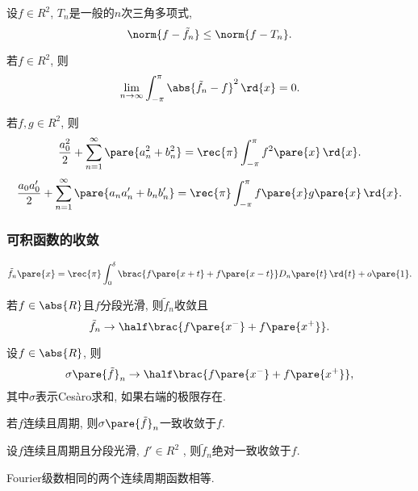 \documentclass[hidelinks]{ctexart}
\begin{document}
\begin{finale}
    \begin{proposition}[范数最优性]
        设$f\in R^2$, $T_n$是一般的$n$次三角多项式,
        \[ \norm{f-\tilde{f}_n} \le \norm{f-T_n}. \]
    \end{proposition}
    \begin{lemma}[平方平均收敛]
        若$f\in R^2$, 则
        \[ \lim_{n\rightarrow \infty} \int_{-\pi}^\pi \abs{\tilde{f}_n-f}^2\,\rd{x} = 0. \]
    \end{lemma}
    \begin{lemma}[Parseval]
        若$f,g\in R^2$, 则
        \[ \frac{a_0^2}{2} + \sum_{n=1}^\infty \pare{a_n^2+b_n^2} = \rec{\pi}\int_{-\pi}^\pi f^2\pare{x}\,\rd{x}. \]
        \[ \frac{a_0 a'_0}{2} + \sum_{n=1}^\infty \pare{a_na'_n+b_nb'_n} = \rec{\pi}\int_{-\pi}^\pi f\pare{x}g\pare{x}\,\rd{x}. \]
    \end{lemma}
\end{finale}


\subsubsection{可积函数的收敛} %
\label{ssub:可积函数的收敛}

\begin{finale}
    \begin{theorem}[局部化定理]
        \[ \tilde{f}_n\pare{x} = \rec{\pi}\int_0^\delta \brac{f\pare{x+t}+f\pare{x-t}}D_n\pare{t}\,\rd{t} + o\pare{1}. \]
    \end{theorem}
    \begin{theorem}[Dirichlet定理]
        若$f\in\abs{R}$且$f$分段光滑, 则$\tilde{f}_n$收敛且
        \[ \tilde{f}_n \rightarrow \half\brac{f\pare{x^-}+f\pare{x^+}}. \]
    \end{theorem}
    \begin{theorem}
        设$f\in\abs{R}$, 则
        \[ \sigma\pare{\tilde{f}}_n \rightarrow \half\brac{f\pare{x^-}+f\pare{x^+}}, \]
        其中$\sigma$表示Ces\`aro求和, 如果右端的极限存在.
    \end{theorem}
    \begin{theorem}
        若$f$连续且周期, 则$\sigma\pare{\tilde{f}}_n$一致收敛于$f$.
    \end{theorem}
    \begin{theorem}
        设$f$连续且周期且分段光滑, $f'\in R^2$ , 则$\tilde{f}_n$绝对一致收敛于$f$.
    \end{theorem}
    \begin{theorem}[唯一性定理]
        Fourier级数相同的两个连续周期函数相等.
    \end{theorem}
\end{finale}
\end{document}
